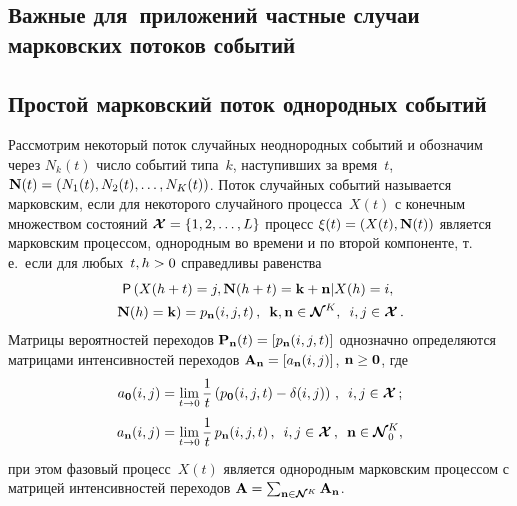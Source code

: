 \begin{multicols}{2}
\section{Важные для~приложений частные случаи марковских потоков 
событий}

\subsection{Простой марковский поток однородных событий}

  Рассмотрим некоторый поток случайных неоднородных событий и 
обозначим через $N_k(t)$ чис\-ло событий типа~$k$, наступивших за время~$t$, 
$\mathbf{N}(t)\hm= (N_1(t), N_2(t), \ldots, N_K(t))$. Поток случайных событий 
называется марковским, если для некоторого случайного процесса~$X(t)$ с 
конечным \mbox{множеством} состояний $\boldsymbol{\mathcal{X}}\hm= \{1,2,\ldots , 
L\}$ процесс $\xi(t)\hm= (X(t), \mathbf{N}(t))$ является марковским процессом, 
однородным во времени и по второй компоненте, т.\,е.\ если для любых~$t, 
h\hm>0$ справедливы равенства
  \begin{multline*}
  {\sf P}\left(X(h+t)=j, \mathbf{N}(h+t)=\mathbf{k}+\mathbf{n}\vert X(h)=i, \right.\\
\left.\mathbf{N}(h)=\mathbf{k}\right)=p_{\mathbf{n}}(i,j,t)\,,\enskip
  \mathbf{k}, \mathbf{n} \in \boldsymbol{\mathcal{N}}^K,\enskip i,j\in 
\boldsymbol{\mathcal{X}}\,.
  \end{multline*}
Матрицы вероятностей переходов $\mathbf{P}_{\mathbf{n}}(t)\hm= 
[p_{\mathbf{n}}(i,j,t)]$ однозначно определяются матрицами интенсивностей 
переходов $\mathbf{A}_{\mathbf{n}}\hm= \left[ a_{\mathbf{n}}(i,j)\right]$, 
$\mathbf{n}\hm\geq \mathbf{0}$, где
\begin{align*}
a_{\mathbf{0}}(i,j) &=\lim\limits_{t\to0} \displaystyle\frac{\displaystyle 1\mathstrut}{\displaystyle t\mathstrut}\left( p_{\mathbf{0}}(i,j,t)-\delta(i,j)\right)\,,\enskip
 i,j\in  \boldsymbol{\mathcal{X}}\,;\\
a_{\mathbf{n}}(i,j) &=\lim\limits_{t\to0} \displaystyle\frac{\displaystyle 1\mathstrut}{\displaystyle t\mathstrut}\, p_{\mathbf{n}}(i,j,t)\,,\enskip i,j\in 
\boldsymbol{\mathcal{X}}\,,\enskip \mathbf{n}\in \boldsymbol{\mathcal{N}}^K_0,
\end{align*}
при этом фазовый процесс~$X(t)$ является однородным марковским 
процессом с матрицей интенсивностей переходов $\mathbf{A}\hm= 
\sum\nolimits_{\mathbf{n}\in \boldsymbol{\mathcal{N}}^K} 
\mathbf{A}_{\mathbf{n}}$.
  

\end{multicols}
